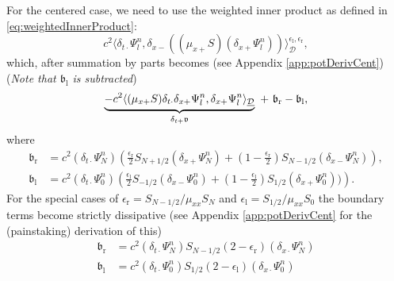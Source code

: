 \documentclass[dvipsnames]{article}
\def\dxp{\delta_{x+}}
\def\dxm{\delta_{x-}}
\def\mup{\mu_{x+}}
\def\Psiln{\Psi_l^n}
\def\dtd{\delta_{t\cdot}}
\begin{document}
For the centered case, we need to use the weighted inner product as defined in \eqref{eq:weightedInnerProduct}:
\begin{equation}\label{eq:potContEnergyCent}
c^2\langle \dtd\Psiln, \dxm((\mup S)(\dxp\Psiln))\rangle_\mathcal{D}^{\epsilon_\text{l},\epsilon_\text{r}},
\end{equation}
which, after summation by parts becomes (see Appendix \ref{app:potDerivCent}) (\textit{Note that $\mathfrak{b}_\text{l}$ is subtracted})
\begin{equation}\label{eq:discROCPotBoundCent}
    \underbrace{-c^2\langle(\mu_{x+}S)\dtd\dxp\Psiln, \dxp\Psiln\rangle_{\underline{\mathcal{D}}}}_{\let\scriptstyle\textstyle\delta_{t+}\mathfrak{v}}\ +\ \mathfrak{b}_\text{r} - \mathfrak{b}_\text{l},
\end{equation}
where
\begin{subequations}
\begin{align}
 \mathfrak{b}_\text{r} &= c^2(\dtd\Psi_N^n)\left(\frac{\epsilon_\text{r}}{2}S_{N+1/2}(\dxp \Psi_N^n) + \left(1-\frac{\epsilon_\text{r}}{2}\right)S_{N-1/2}(\dxm\Psi_N^n)\right), \\
 \mathfrak{b}_\text{l} &= c^2(\dtd\Psi_0^n)\left(\frac{\epsilon_\text{l}}{2}S_{-1/2}(\dxm\Psi_0^n)+\left(1-\frac{\epsilon_\text{l}}{2}\right)S_{1/2}(\dxp \Psi_0^n))\right).
\end{align}
\end{subequations}
For the special cases of $\epsilon_\text{r} = S_{N-1/2}/\mu_{xx}S_N$ and $\epsilon_\text{l} = S_{1/2}/\mu_{xx}S_0$ the boundary terms become strictly dissipative (see Appendix \ref{app:potDerivCent} for the (painstaking) derivation of this)
\begin{subequations}\label{eq:centStrictDissip}
\begin{align}
    \mathfrak{b}_\text{r} &= c^2 (\dtd\Psi_N^n)S_{N-1/2}(2-\epsilon_\text{r})(\delta_{x\cdot}\Psi_N^n)\label{eq:centStrictDissipRight}\\
    \mathfrak{b}_\text{l} &= c^2 (\dtd\Psi_0^n)S_{1/2}(2-\epsilon_\text{l})(\delta_{x\cdot}\Psi_0^n)\label{eq:centStrictDissipLeft}
\end{align}
\end{subequations}
\end{document}
